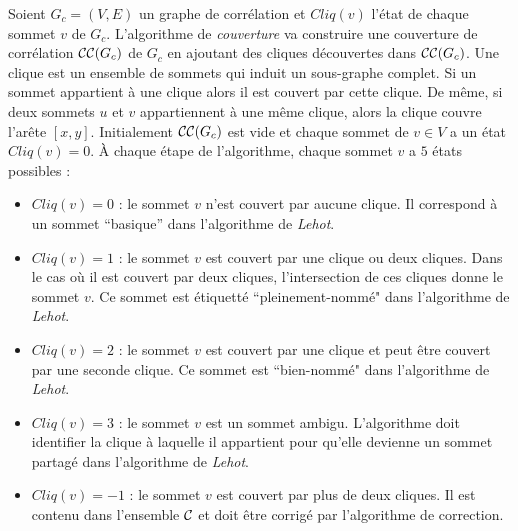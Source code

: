 Soient $G_c = (V,E)$ un graphe de corr\'elation et $Cliq(v)$ l'\'etat de chaque sommet $v$ de   $G_c$.
L'algorithme de {\em couverture} va construire une couverture de corr\'elation ${\cal CC}(G_c)$ de $G_c$ en ajoutant des cliques d\'ecouvertes dans ${\cal CC}(G_c)$.  
Une clique est un ensemble de sommets qui induit un sous-graphe complet. 
Si un sommet appartient \`a une clique alors il est couvert par cette clique. 
De m\^eme, si deux sommets $u$ et $v$ appartiennent \`a une m\^eme clique, alors la clique couvre l'ar\^ete $[x,y]$.
Initialement ${\cal CC}(G_c)$ est vide et chaque sommet de $v \in V$ a un \'etat $Cliq(v)=0$. 
\newline
\`A chaque \'etape de l'algorithme, chaque sommet $v$ a $5$ \'etats possibles :
\begin{itemize}
	\item $Cliq(v)=0$ : le sommet $v$ n'est couvert par aucune clique. Il correspond \`a un sommet ``basique'' dans l'algorithme de {\em Lehot}.
	\item $Cliq(v)=1$ : le sommet $v$ est couvert par une clique ou deux cliques. Dans le cas o\`u il est couvert par deux cliques, l'intersection de ces cliques donne le sommet $v$. Ce sommet est \'etiquett\'e ``pleinement-nomm\'e" dans l'algorithme de {\em Lehot}.
	\item $Cliq(v) = 2$ : le sommet $v$ est couvert par une clique et peut \^etre couvert par une seconde clique. Ce sommet est ``bien-nomm\'e" dans l'algorithme de {\em Lehot}.
	\item $Cliq(v) = 3$ : le sommet $v$ est un sommet ambigu. L'algorithme doit identifier la clique \`a laquelle il appartient pour qu'elle devienne un sommet partag\'e dans l'algorithme de {\em Lehot}.
	\item $Cliq(v) = -1$ :  le sommet $v$ est couvert par plus de deux cliques. Il est contenu dans l'ensemble $\cal C$ et doit \^etre corrig\'e par l'algorithme de correction.
\end{itemize}


